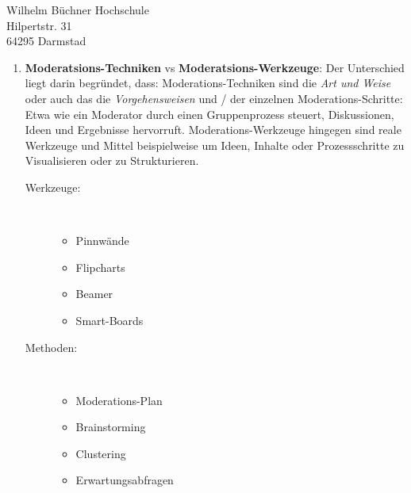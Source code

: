 \documentclass[
    version=last,           %
    DIV=13,                 %
    BCOR=0mm,               %
    paper=a4,               %
    fontsize=12pt,          %
    firsthead=on,           %
    firstfoot=on,           %
    pagenumber=on,i         %
    parskip=half,           %
    enlargefirstpage=,      %
    firsthead=on,           %
    fromrule=afteraddress,  %
    priority=off,           %
    backaddress=true,       %
    refline=dateright,      %
	fromalign=right,	    %
    fromemail=on,i          %
    fromurl=on,             %
    frombank=on,
    fromphone=on,           %
    frommobilephone=on      %
    fromlogo=on,            %
    addrfield=on,           %
    subject=untitled,  %
    foldmarks=off,          %
    numericaldate=off,      %
	pagenumber=right,	        %
	parskip=half,	        %
    headsep=false,          %
    footsepline=true,       %
    foldmarks=off,		    %
	]{scrlttr2}
\begin{document}
\begin{letter} {Wilhelm Büchner Hochschule \\
Hilpertstr. 31\\
64295 Darmstad}
\begin{itemize}
\begin{enumerate}
            \vspace{1cm}
            \item \textbf{Moderatsions-Techniken} vs \textbf{Moderatsions-Werkzeuge}:
                Der Unterschied liegt darin begründet, dass:
                Moderations-Techniken sind die \textit{Art und Weise} oder auch
                das die \textit{Vorgehensweisen} und / der einzelnen Moderations-Schritte:
                Etwa wie ein Moderator durch einen Gruppenprozess steuert,
                Diskussionen, Ideen und Ergebnisse hervorruft. Moderations-Werkzeuge
                hingegen sind reale Werkzeuge und Mittel beispielweise um Ideen,
                Inhalte oder Prozessschritte zu Visualisieren oder zu Strukturieren.
            \begin{description}
        \item[Werkzeuge:] \hfill \\
            \begin{itemize}
                \item Pinnwände
                \item Flipcharts
                \item Beamer
                \item Smart-Boards
            \end{itemize}
        \item[Methoden:] \hfill \\
            \begin{itemize}
                \item Moderations-Plan
                \item Brainstorming
                \item Clustering
                \item Erwartungsabfragen
            \end{itemize}
            \end{description}


\end{enumerate}
\end{itemize}
\end{letter}
\end{document}
